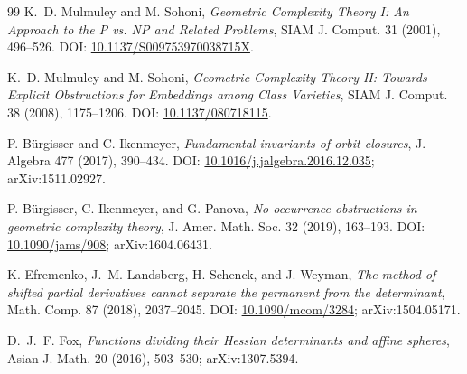 \documentclass[11pt]{article}
\theoremstyle{remark}
\begin{document}
\begin{thebibliography}{99}
K.~D. Mulmuley and M. Sohoni,
\emph{Geometric Complexity Theory I: An Approach to the P vs. NP and Related Problems},
SIAM J. Comput. 31 (2001), 496--526.
DOI: \href{https://doi.org/10.1137/S009753970038715X}{10.1137/S009753970038715X}.

K.~D. Mulmuley and M. Sohoni,
\emph{Geometric Complexity Theory II: Towards Explicit Obstructions for Embeddings among Class Varieties},
SIAM J. Comput. 38 (2008), 1175--1206.
DOI: \href{https://doi.org/10.1137/080718115}{10.1137/080718115}.

P. B\"urgisser and C. Ikenmeyer,
\emph{Fundamental invariants of orbit closures},
J. Algebra 477 (2017), 390--434.
DOI: \href{https://doi.org/10.1016/j.jalgebra.2016.12.035}{10.1016/j.jalgebra.2016.12.035}; arXiv:1511.02927.

P. B\"urgisser, C. Ikenmeyer, and G. Panova,
\emph{No occurrence obstructions in geometric complexity theory},
J. Amer. Math. Soc. 32 (2019), 163--193.
DOI: \href{https://doi.org/10.1090/jams/908}{10.1090/jams/908}; arXiv:1604.06431.

K. Efremenko, J.~M. Landsberg, H. Schenck, and J. Weyman,
\emph{The method of shifted partial derivatives cannot separate the permanent from the determinant},
Math. Comp. 87 (2018), 2037--2045.
DOI: \href{https://doi.org/10.1090/mcom/3284}{10.1090/mcom/3284}; arXiv:1504.05171.

D.~J.~F. Fox,
\emph{Functions dividing their Hessian determinants and affine spheres},
Asian J. Math. 20 (2016), 503--530; arXiv:1307.5394.
\end{thebibliography}
\end{document}
